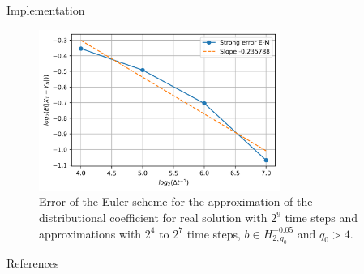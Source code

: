 \documentclass{beamer}
\begin{document}
\begin{frame}{Implementation}
		\begin{figure}
				\includegraphics[width=0.7\textwidth]{distributional_2_4_2_7_error}
				\caption{Error of the Euler scheme for the approximation of the distributional coefficient for real solution with $2^9$ time steps and approximations with $2^4$ to $2^7$ time steps, $ b \in H^{-0.05}_{2,q_0} $ and $q_0>4$.}
		\end{figure}
\end{frame}

\begin{frame}[allowframebreaks]{References}
        \printbibliography
\end{frame}
\end{document}
